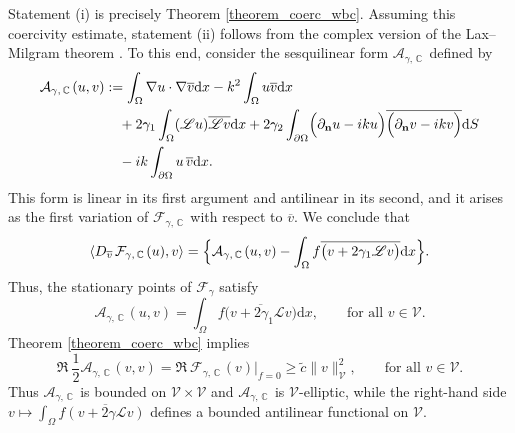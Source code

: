 \documentclass[twoside,11pt]{article}
\def\d{{\mathrm d}}
\def\C{{\mathbb C}}
\def\L{{\mathscr{L}}}
\def\vbar{\overline{v}}
\def\Vc{{\mathscr V}}
\def\L{{\mathscr{L}}}
\begin{document}
{\noindent
Statement (i) is precisely Theorem \ref{theorem_coerc_wbc}.
Assuming this coercivity estimate, statement (ii) follows from the
complex version of the Lax--Milgram theorem \cite[Chapter VII]{Dautray_Lions_v2_1988}. To this end, consider the sesquilinear form $\mathcal{A}_{\gamma,\,  \C \, }$ defined by 
\begin{equation}\label{Aform_reg_wbc}
\begin{split}
\mathcal{A}_{\gamma,\,  \C \, }(u,v)
&:= \int_\Omega \nabla u\cdot \nabla \overline{v}  \d x  -  k^2 \int_\Omega u \overline{v}  \d x \\
&\quad +  2\gamma_1 \int_{\Omega} (\L u)  \overline{\L v}  \d x
 +  2\gamma_2 \int_{\partial\Omega} 
\Bigl(\partial_{\mathbf n}u - i k u \Bigr) 
\overline{\Bigl(\partial_{\mathbf n}v - i k v \Bigr)}  \d S \\
&\quad   -  {ik} \int_{\partial \Omega}u \, \vbar  \d x .
\end{split}
\end{equation}
{This form is linear in its first argument and antilinear in its second, and it arises as the first variation of $\mathcal{F}_{\gamma,\,  \C \, }$ with respect to $\vbar .$}
We conclude that
\begin{equation}\label{Energy_H_gamma_Re_2_wbc}
\begin{split}
\langle D_{\vbar\, }  \mathcal{F}_{\gamma,\,  \C \, }(u), v \rangle
=  \Bigl\{ \mathcal{A}_{\gamma,\,  \C \, }(u,v)  -  \int_{\Omega} f  \overline{\bigl(v + 2\gamma_1 \L v\bigr)}  \d x \Bigr\}.
\end{split}
\end{equation}
Thus, the stationary points of $\mathcal{F}_\gamma$ satisfy
\begin{equation}\label{Energy_H_gamma_Re_3_wbc}
\mathcal{A}_{\gamma,\,  \C \, } (u,v)  =  \int_{\Omega} f  \overline{\bigl(v + 2\gamma_1 \L v\bigr)}  \d x ,
\qquad \text{for all } v \in \Vc .
\end{equation}
Theorem \ref{theorem_coerc_wbc} implies
\begin{equation}%
\Re \  \frac{1}{2} \mathcal{A}_{\gamma,\,  \C \, }(v,v)
 = \Re \  \mathcal{F}_{\gamma,\,  \C \, } (v)\Big|_{f=0}
 \ge  \tilde c  \|v\|_{\Vc}^{2},
\qquad \text{for all } v\in \Vc .
\end{equation}
{Thus $\mathcal{A}_{\gamma,\,  \C \, }$ is bounded on $\Vc \times\Vc $ and $  \mathcal{A}_{\gamma,\,  \C \, }$ is $\Vc$-elliptic, while the right-hand side $v\mapsto \int_\Omega f \overline{(v+2\gamma \L v)}$ defines a bounded antilinear functional on $\Vc$.}
}
\end{document}
